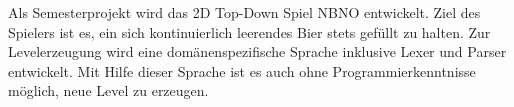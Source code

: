 Als Semesterprojekt wird das 2D Top-Down Spiel NBNO entwickelt.
Ziel des Spielers ist es, ein sich kontinuierlich leerendes Bier stets gefüllt zu halten.
Zur Levelerzeugung wird eine domänenspezifische Sprache inklusive Lexer und Parser entwickelt.
Mit Hilfe dieser Sprache ist es auch ohne Programmierkenntnisse möglich, neue Level zu erzeugen.